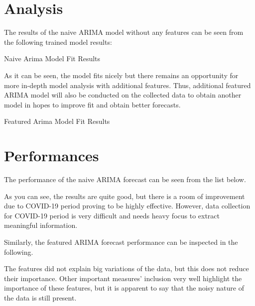 \documentclass[11pt, a4paper, leqno]{article}
\begin{document}
\pagebreak
\section{Analysis}
\label{sec:Anlys}

The results of the naive ARIMA model without any features can be seen from the following trained model results:

\begin{table}[!htbp]
    
    \caption{\label{tab:python-summary} Naive Arima Model Fit Results}
\end{table}


As it can be seen, the model fits nicely but there remains an opportunity for more in-depth model analysis with additional features. Thus, additional featured ARIMA model will also be conducted on the collected data to obtain another model in hopes to improve fit and obtain better forecasts.


\begin{table}
    
    \caption{\label{tab:python-summary} Featured Arima Model Fit Results}
\end{table}

\pagebreak
\section{Performances}
\label{sec:Perf}

The performance of the naive ARIMA forecast can be seen from the list below.


\begingroup
\obeylines
%
\endgroup%

As you can see, the results are quite good, but there is a room of improvement due to COVID-19 period proving to be highly effective. However, data collection for COVID-19 period is very difficult and needs heavy focus to extract meaningful information.

Similarly, the featured ARIMA forecast performance can be inspected in the following.

\begingroup
\obeylines
%
\endgroup%

The features did not explain big variations of the data, but this does not reduce their importance. Other important measures' inclusion very well highlight the importance of these features, but it is apparent to say that the noisy nature of the data is still present.
\end{document}
